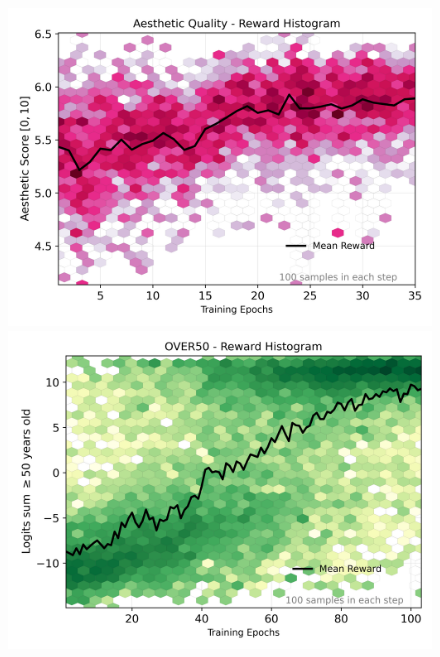 
\begin{figure}[ht]
  \centering
  \begin{minipage}{0.5\textwidth}
      \centering
      \includegraphics[width=1\textwidth]{img/results/reward_hist-laion-aesthetic.png} %
  \end{minipage}\hfill
  \begin{minipage}{0.5\textwidth}
      \centering
      \includegraphics[width=1\textwidth]{img/results/reward_hist-over50.png} %

\end{minipage}
\end{figure}

